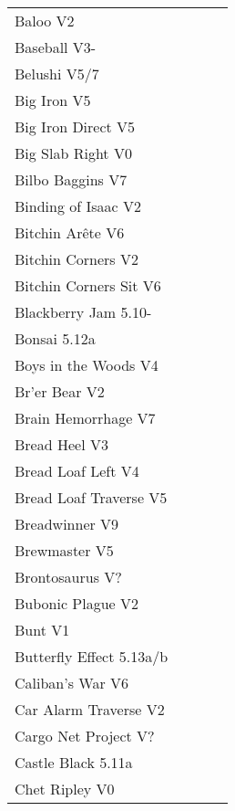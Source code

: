 \begin{flushleft}
\begin{center}
\begin{supertabular}{p{0.76\linewidth}p{0.08\linewidth}}
Baloo V2 & \pageref{rt:Baloo} \\
Baseball V3- & \pageref{rt:Baseball} \\
Belushi V5/7 & \pageref{rt:Belushi} \\
Big Iron V5 & \pageref{rt:Big Iron} \\
Big Iron Direct V5 & \pageref{vr:Big Iron Direct} \\
Big Slab Right V0 & \pageref{rt:Big Slab Right} \\
Bilbo Baggins V7 & \pageref{vr:Bilbo Baggins} \\
Binding of Isaac V2 & \pageref{rt:Binding of Isaac} \\
Bitchin Arête V6 & \pageref{rt:Bitchin Arête} \\
Bitchin Corners V2 & \pageref{rt:Bitchin Corners} \\
Bitchin Corners Sit V6 & \pageref{vr:Bitchin Corners Sit} \\
Blackberry Jam 5.10- & \pageref{rt:Blackberry Jam} \\
Bonsai 5.12a & \pageref{rt:Bonsai} \\
Boys in the Woods V4 & \pageref{rt:Boys in the Woods} \\
Br'er Bear V2 & \pageref{rt:Br'er Bear} \\
Brain Hemorrhage V7 & \pageref{vr:Brain Hemorrhage} \\
Bread Heel V3 & \pageref{rt:Bread Heel} \\
Bread Loaf Left V4 & \pageref{rt:Bread Loaf Left} \\
Bread Loaf Traverse V5 & \pageref{rt:Bread Loaf Traverse} \\
Breadwinner V9 & \pageref{rt:Breadwinner} \\
Brewmaster V5 & \pageref{rt:Brewmaster} \\
Brontosaurus V? & \pageref{rt:Brontosaurus} \\
Bubonic Plague V2 & \pageref{rt:Bubonic Plague} \\
Bunt V1 & \pageref{rt:Bunt} \\
Butterfly Effect 5.13a/b & \pageref{rt:Butterfly Effect} \\
Caliban's War V6 & \pageref{rt:Caliban's War} \\
Car Alarm Traverse V2 & \pageref{rt:Car Alarm Traverse} \\
Cargo Net Project V? & \pageref{rt:Cargo Net Project} \\
Castle Black 5.11a & \pageref{rt:Castle Black} \\
Chet Ripley V0 & \pageref{rt:Chet Ripley} \\

\end{supertabular}
\end{center}
\end{flushleft}
